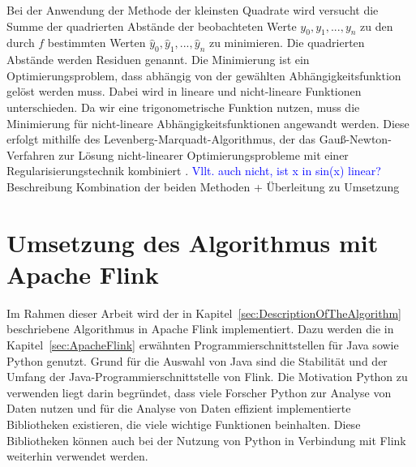 Bei der Anwendung der Methode der kleinsten Quadrate wird versucht die Summe der quadrierten Abstände der beobachteten Werte \(y_0, y_1,...,y_n\) zu den durch \(f\) bestimmten Werten \(\hat{y}_0, \hat{y}_1,...,\hat{y}_n\) zu minimieren. Die quadrierten Abstände werden Residuen genannt. Die Minimierung ist ein Optimierungsproblem, dass abhängig von der gewählten Abhängigkeitsfunktion gelöst werden muss. Dabei wird in lineare und nicht-lineare Funktionen unterschieden. Da wir eine trigonometrische Funktion nutzen, muss die Minimierung für nicht-lineare Abhängigkeitsfunktionen angewandt werden. Diese erfolgt mithilfe des Levenberg-Marquadt-Algorithmus, der das Gauß-Newton-Verfahren zur Lösung nicht-linearer Optimierungsprobleme mit einer Regularisierungstechnik kombiniert \cite{Levenberg1978}. \textcolor{blue}{Vllt. auch nicht, ist x in sin(x) linear?} \\

Beschreibung Kombination der beiden Methoden + Überleitung zu Umsetzung


\section{Umsetzung des Algorithmus mit Apache Flink}
Im Rahmen dieser Arbeit wird der in Kapitel~\ref{sec:DescriptionOfTheAlgorithm} beschriebene Algorithmus in Apache Flink implementiert. Dazu werden die in Kapitel~\ref{sec:ApacheFlink} erwähnten Programmierschnittstellen für Java sowie Python genutzt. Grund für die Auswahl von Java sind die Stabilität und der Umfang der Java-Programmierschnittstelle von Flink. Die Motivation Python zu verwenden liegt darin begründet, dass viele Forscher Python zur Analyse von Daten nutzen und für die Analyse von Daten effizient implementierte Bibliotheken existieren, die viele wichtige Funktionen beinhalten. Diese Bibliotheken können auch bei der Nutzung von Python in Verbindung mit Flink weiterhin verwendet werden. 


